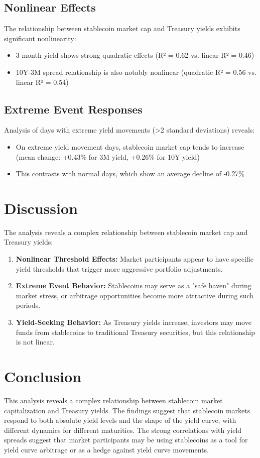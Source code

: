 \documentclass[12pt,a4paper]{article}
\begin{document}
\subsection{Nonlinear Effects}
The relationship between stablecoin market cap and Treasury yields exhibits significant nonlinearity:
\begin{itemize}
    \item 3-month yield shows strong quadratic effects (R² = 0.62 vs. linear R² = 0.46)
    \item 10Y-3M spread relationship is also notably nonlinear (quadratic R² = 0.56 vs. linear R² = 0.54)
\end{itemize}

\subsection{Extreme Event Responses}
Analysis of days with extreme yield movements (>2 standard deviations) reveals:
\begin{itemize}
    \item On extreme yield movement days, stablecoin market cap tends to increase (mean change: +0.43\% for 3M yield, +0.26\% for 10Y yield)
    \item This contrasts with normal days, which show an average decline of -0.27\%
\end{itemize}

\section{Discussion}
The analysis reveals a complex relationship between stablecoin market cap and Treasury yields:

\begin{enumerate}
    \item \textbf{Nonlinear Threshold Effects:} Market participants appear to have specific yield thresholds that trigger more aggressive portfolio adjustments.
    
    \item \textbf{Extreme Event Behavior:} Stablecoins may serve as a "safe haven" during market stress, or arbitrage opportunities become more attractive during such periods.
    
    \item \textbf{Yield-Seeking Behavior:} As Treasury yields increase, investors may move funds from stablecoins to traditional Treasury securities, but this relationship is not linear.
\end{enumerate}

\section{Conclusion}
This analysis reveals a complex relationship between stablecoin market capitalization and Treasury yields. The findings suggest that stablecoin markets respond to both absolute yield levels and the shape of the yield curve, with different dynamics for different maturities. The strong correlations with yield spreads suggest that market participants may be using stablecoins as a tool for yield curve arbitrage or as a hedge against yield curve movements.

\balance
\end{document}
